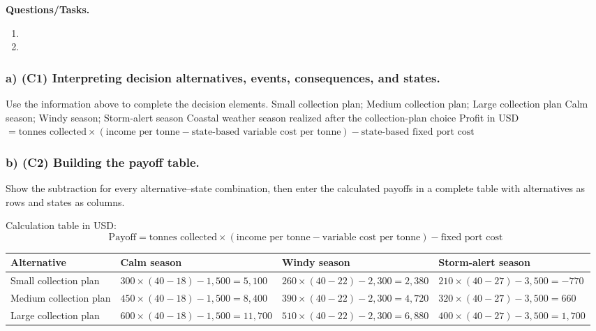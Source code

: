 \textbf{Questions/Tasks.}
\begin{enumerate}[label=\textbf{\alph*)}]
 \item {}
 \item {}
\end{enumerate}
\subsubsection*{a) \textbf{(C1)} Interpreting decision alternatives, events, consequences, and states.}
\label{subsec:problem20-coastal-recycling-collection-c1}
Use the information above to complete the decision elements.
\DecisionElementsTable
{Small collection plan; Medium collection plan; Large collection plan}
{Calm season; Windy season; Storm-alert season}
{Coastal weather season realized after the collection-plan choice}
{Profit in USD $= \text{tonnes collected} \times (\text{income per tonne} - \text{state-based variable cost per tonne}) - \text{state-based fixed port cost}$}
\subsubsection*{b) \textbf{(C2)} Building the payoff table.}
\label{subsec:problem20-coastal-recycling-collection-c2}
Show the subtraction for every alternative--state combination, then enter the calculated payoffs in a complete table with alternatives as rows and states as columns.

Calculation table in USD:
\[
\text{Payoff}=\text{tonnes collected}\times(\text{income per tonne}-\text{variable cost per tonne})-\text{fixed port cost}
\]
\begin{center}
\small
\begin{tabular}{llll}
\toprule
Alternative & Calm season & Windy season & Storm-alert season \\
\midrule
Small collection plan & $300 \times (40 - 18) - 1{,}500 = 5{,}100$ & $260 \times (40 - 22) - 2{,}300 = 2{,}380$ & $210 \times (40 - 27) - 3{,}500 = -770$ \\
Medium collection plan & $450 \times (40 - 18) - 1{,}500 = 8{,}400$ & $390 \times (40 - 22) - 2{,}300 = 4{,}720$ & $320 \times (40 - 27) - 3{,}500 = 660$ \\
Large collection plan & $600 \times (40 - 18) - 1{,}500 = 11{,}700$ & $510 \times (40 - 22) - 2{,}300 = 6{,}880$ & $400 \times (40 - 27) - 3{,}500 = 1{,}700$ \\
\bottomrule
\end{tabular}
\end{center}

